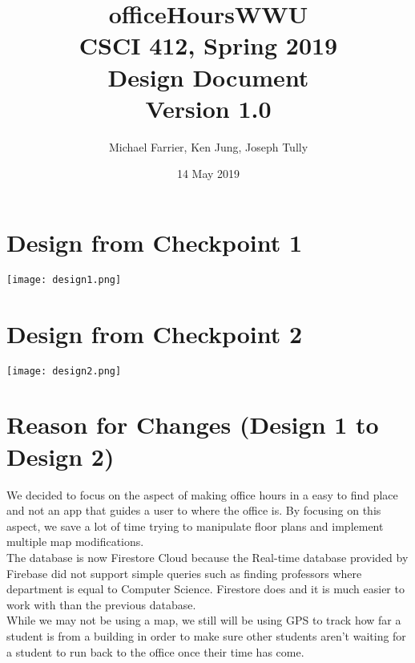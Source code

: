 \documentclass[11pt]{article} %
\begin{document}
\title{officeHoursWWU\\ CSCI 412, Spring 2019\\ Design Document \\ Version 1.0}
\author{Michael Farrier, Ken Jung, Joseph Tully}
\date{14 May 2019}
\maketitle

\pagebreak

\section{Design from Checkpoint 1}
\begin{center}
\texttt{[image: design1.png]}\\
\end{center}

\pagebreak

\section{Design from Checkpoint 2}
\begin{center}
\texttt{[image: design2.png]}\\
\end{center}

\pagebreak

\section{Reason for Changes (Design 1 to Design 2)}
We decided to focus on the aspect of making office hours in a easy to find place and not an app that guides a user to where the office is. By focusing on this aspect, we save a lot of time trying to manipulate floor plans and implement multiple map modifications. \\

The database is now Firestore Cloud because the Real-time database provided by Firebase did not support simple queries such as finding professors where department is equal to Computer Science. Firestore does and it is much easier to work with than the previous database. \\

While we may not be using a map, we still will be using GPS to track how far a student is from a building in order to make sure other students aren't waiting for a student to run back to the office once their time has come. 
\end{document}
